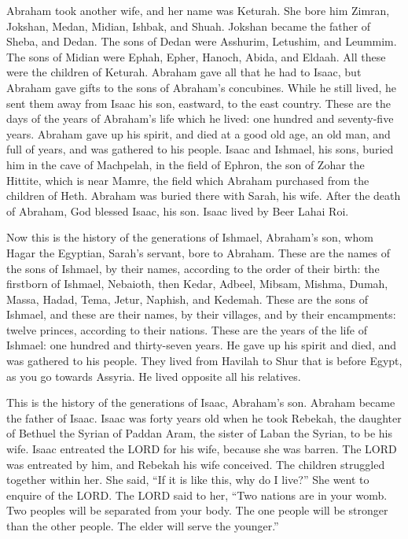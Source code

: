  Abraham took another wife, and her name was Keturah.
 She bore him Zimran, Jokshan, Medan, Midian, Ishbak, and
Shuah.  Jokshan became the father of Sheba, and Dedan. The
sons of Dedan were Asshurim, Letushim, and Leummim.  The
sons of Midian were Ephah, Epher, Hanoch, Abida, and Eldaah. All these
were the children of Keturah.  Abraham gave all that he
had to Isaac,  but Abraham gave gifts to the sons of
Abraham's concubines. While he still lived, he sent them away from Isaac
his son, eastward, to the east country.  These are the
days of the years of Abraham's life which he lived: one hundred and
seventy-five years.  Abraham gave up his spirit, and died
at a good old age, an old man, and full of years, and was gathered to
his people.  Isaac and Ishmael, his sons, buried him in
the cave of Machpelah, in the field of Ephron, the son of Zohar the
Hittite, which is near Mamre,  the field which Abraham
purchased from the children of Heth. Abraham was buried there with
Sarah, his wife.  After the death of Abraham, God blessed
Isaac, his son. Isaac lived by Beer Lahai Roi.

 Now this is the history of the generations of Ishmael,
Abraham's son, whom Hagar the Egyptian, Sarah's servant, bore to
Abraham.  These are the names of the sons of Ishmael, by
their names, according to the order of their birth: the firstborn of
Ishmael, Nebaioth, then Kedar, Adbeel, Mibsam,  Mishma,
Dumah, Massa,  Hadad, Tema, Jetur, Naphish, and Kedemah.
 These are the sons of Ishmael, and these are their
names, by their villages, and by their encampments: twelve princes,
according to their nations.  These are the years of the
life of Ishmael: one hundred and thirty-seven years. He gave up his
spirit and died, and was gathered to his people.  They
lived from Havilah to Shur that is before Egypt, as you go towards
Assyria. He lived opposite all his relatives.

 This is the history of the generations of Isaac,
Abraham's son. Abraham became the father of Isaac.  Isaac
was forty years old when he took Rebekah, the daughter of Bethuel the
Syrian of Paddan Aram, the sister of Laban the Syrian, to be his wife.
 Isaac entreated the LORD for his wife, because she was
barren. The LORD was entreated by him, and Rebekah his wife conceived.
 The children struggled together within her. She said,
``If it is like this, why do I live?'' She went to enquire of the LORD.
 The LORD said to her, ``Two nations are in your womb.
Two peoples will be separated from your body. The one people will be
stronger than the other people. The elder will serve the younger.''

